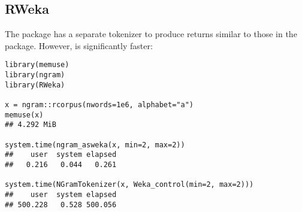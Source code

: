 \subsection{RWeka}

The  package has a separate tokenizer to produce returns similar to 
those in the  package.  However,  is significantly faster:

\begin{lstlisting}[language=rr]
library(memuse)
library(ngram)
library(RWeka)

x = ngram::rcorpus(nwords=1e6, alphabet="a")
memuse(x)
## 4.292 MiB

system.time(ngram_asweka(x, min=2, max=2))
##    user  system elapsed 
##   0.216   0.044   0.261 

system.time(NGramTokenizer(x, Weka_control(min=2, max=2)))
##    user  system elapsed 
## 500.228   0.528 500.056 
\end{lstlisting}